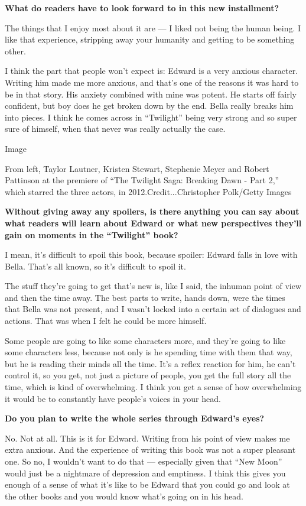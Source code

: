 \textbf{What do readers have to look forward to in this new
installment?}

The things that I enjoy most about it are --- I liked not being the
human being. I like that experience, stripping away your humanity and
getting to be something other.

I think the part that people won't expect is: Edward is a very anxious
character. Writing him made me more anxious, and that's one of the
reasons it was hard to be in that story. His anxiety combined with mine
was potent. He starts off fairly confident, but boy does he get broken
down by the end. Bella really breaks him into pieces. I think he comes
across in ``Twilight'' being very strong and so super sure of himself,
when that never was really actually the case.

Image

From left, Taylor Lautner, Kristen Stewart, Stephenie Meyer and Robert
Pattinson at the premiere of ``The Twilight Saga: Breaking Dawn - Part
2,'' which starred the three actors, in 2012.Credit...Christopher
Polk/Getty Images

\textbf{Without giving away any spoilers, is there anything you can say
about what readers will learn about Edward or what new perspectives
they'll gain on moments in the ``Twilight'' book?}

I mean, it's difficult to spoil this book, because spoiler: Edward falls
in love with Bella. That's all known, so it's difficult to spoil it.

The stuff they're going to get that's new is, like I said, the inhuman
point of view and then the time away. The best parts to write, hands
down, were the times that Bella was not present, and I wasn't locked
into a certain set of dialogues and actions. That was when I felt he
could be more himself.

Some people are going to like some characters more, and they're going to
like some characters less, because not only is he spending time with
them that way, but he is reading their minds all the time. It's a reflex
reaction for him, he can't control it, so you get, not just a picture of
people, you get the full story all the time, which is kind of
overwhelming. I think you get a sense of how overwhelming it would be to
constantly have people's voices in your head.

\textbf{Do you plan to write the whole series through Edward's eyes?}

No. Not at all. This is it for Edward. Writing from his point of view
makes me extra anxious. And the experience of writing this book was not
a super pleasant one. So no, I wouldn't want to do that --- especially
given that ``New Moon'' would just be a nightmare of depression and
emptiness. I think this gives you enough of a sense of what it's like to
be Edward that you could go and look at the other books and you would
know what's going on in his head.

